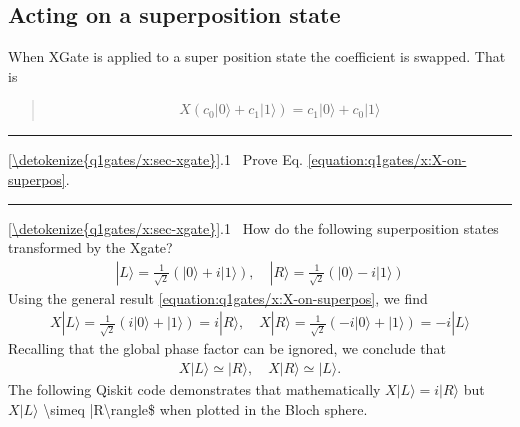 \documentclass[letterpaper,10pt,english]{jupyterBook}
\begin{document}
\subsection{Acting on a superposition state}
\label{\detokenize{q1gates/x:acting-on-a-superposition-state}}
\sphinxAtStartPar
When XGate is applied to a super position state the coefficient is swapped.  That is
\begin{quote}
\begin{equation}\label{equation:q1gates/x:X-on-superpos}
\begin{split}
X \left (c_0 |0\rangle + c_1 |1\rangle\right) = c_1 |0\rangle + c_0 |1\rangle
\end{split}
\end{equation}\end{quote}


\bigskip\hrule\bigskip


\sphinxAtStartPar
{} \hyperref[\detokenize{q1gates/x:sec-xgate}]{\ref{\detokenize{q1gates/x:sec-xgate}}}.1   Prove Eq. \eqref{equation:q1gates/x:X-on-superpos}.


\bigskip\hrule\bigskip


\sphinxAtStartPar
{} \hyperref[\detokenize{q1gates/x:sec-xgate}]{\ref{\detokenize{q1gates/x:sec-xgate}}}.1  How do the following superposition states transformed by the Xgate?
\begin{equation*}
\begin{split}
|L\rangle = \frac{1}{\sqrt{2}} \left (|0\rangle + i |1\rangle\right), \quad |R\rangle = \frac{1}{\sqrt{2}} \left (|0\rangle - i |1\rangle\right)
\end{split}
\end{equation*}
\sphinxAtStartPar
Using the general result \eqref{equation:q1gates/x:X-on-superpos}, we find
\begin{equation*}
\begin{split}
X |L\rangle = \frac{1}{\sqrt{2}} \left (i |0\rangle + |1\rangle\right) = i |R\rangle, \quad
X |R\rangle = \frac{1}{\sqrt{2}} \left (-i |0\rangle + |1\rangle\right) = -i |L\rangle
\end{split}
\end{equation*}
\sphinxAtStartPar
Recalling that the global phase factor can be ignored, we conclude that
\begin{equation*}
\begin{split}
X |L\rangle \simeq |R\rangle, \quad
X |R\rangle \simeq |L\rangle.
\end{split}
\end{equation*}
\sphinxAtStartPar
The following Qiskit code demonstrates that mathematically \(X|L\rangle = i |R\rangle\) but \(X|L\rangle\) \textbackslash{}simeq |R\textbackslash{}rangle\$ when plotted in the Bloch sphere.
\end{document}
